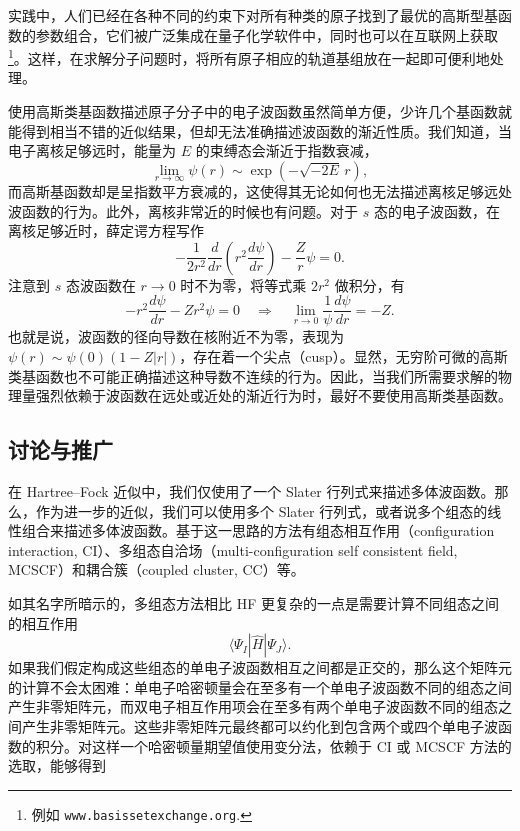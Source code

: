 实践中，人们已经在各种不同的约束下对所有种类的原子找到了最优的高斯型基函数的参数组合，它们被广泛集成在量子化学软件中，同时也可以在互联网上获取\footnote{例如 \texttt{www.basissetexchange.org}.}。这样，在求解分子问题时，将所有原子相应的轨道基组放在一起即可便利地处理。

使用高斯类基函数描述原子分子中的电子波函数虽然简单方便，少许几个基函数就能得到相当不错的近似结果，但却无法准确描述波函数的渐近性质。我们知道，当电子离核足够远时，能量为 $E$ 的束缚态会渐近于指数衰减，
\begin{equation}
 \lim_{r\to\infty}\psi(r)\sim\exp(-\sqrt{-2E}\,r),
\tag{6.4.46}
\end{equation}
而高斯基函数却是呈指数平方衰减的，这使得其无论如何也无法描述离核足够远处波函数的行为。此外，离核非常近的时候也有问题。对于 $s$ 态的电子波函数，在离核足够近时，薛定谔方程写作
\begin{equation}
 -\frac1{2r^2}\frac{d}{dr}\left(r^2\frac{d\psi}{dr}\right)-\frac Zr\psi=0.
\tag{6.4.47}
\end{equation}
注意到 $s$ 态波函数在 $r\to0$ 时不为零，将等式乘 $2r^2$ 做积分，有
\begin{equation}
 -r^2\frac{d\psi}{dr}-Zr^2\psi=0
 \quad\Longrightarrow\quad
 \lim_{r\to0}\frac1\psi\frac{d\psi}{dr}=-Z.
\tag{6.4.48}
\end{equation}
也就是说，波函数的径向导数在核附近不为零，表现为 $\psi(r)\sim\psi(0)(1-Z|r|)$，存在着一个尖点（cusp）。显然，无穷阶可微的高斯类基函数也不可能正确描述这种导数不连续的行为。因此，当我们所需要求解的物理量强烈依赖于波函数在远处或近处的渐近行为时，最好不要使用高斯类基函数。

\subsection{讨论与推广}

在 Hartree--Fock 近似中，我们仅使用了一个 Slater 行列式来描述多体波函数。那么，作为进一步的近似，我们可以使用多个 Slater 行列式，或者说多个组态的线性组合来描述多体波函数。基于这一思路的方法有组态相互作用（configuration interaction, CI）、多组态自洽场（multi-configuration self consistent field, MCSCF）和耦合簇（coupled cluster, CC）等。

如其名字所暗示的，多组态方法相比 HF 更复杂的一点是需要计算不同组态之间的相互作用
\begin{equation}
 \langle\Psi_I|\hat H|\Psi_J\rangle.
\tag{6.4.49}
\end{equation}
如果我们假定构成这些组态的单电子波函数相互之间都是正交的，那么这个矩阵元的计算不会太困难：单电子哈密顿量会在至多有一个单电子波函数不同的组态之间产生非零矩阵元，而双电子相互作用项会在至多有两个单电子波函数不同的组态之间产生非零矩阵元。这些非零矩阵元最终都可以约化到包含两个或四个单电子波函数的积分。对这样一个哈密顿量期望值使用变分法，依赖于 CI 或 MCSCF 方法的选取，能够得到

